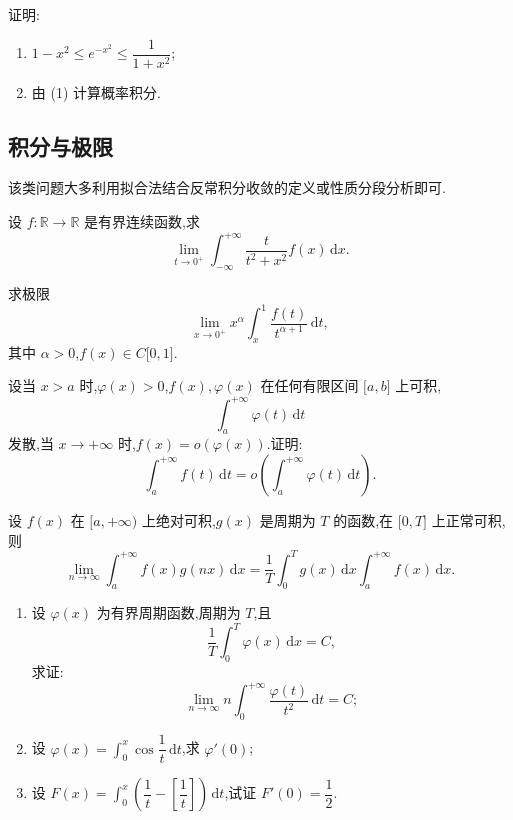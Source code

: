 \documentclass[../数学分析培优讲义.tex]{subfiles}
\begin{document}
\begin{example}
证明:
\begin{enumerate}[label=(\arabic*)]
    \item $1-x^2\leq e^{-x^2}\leq\dfrac{1}{1+x^2}$;
    \item 由 (1) 计算概率积分.
\end{enumerate}
\end{example}
\exampleblank


\newpage

\subsection{积分与极限}

该类问题大多利用拟合法结合反常积分收敛的定义或性质分段分析即可.

\begin{example}
设 $f:\mathbb{R}\to\mathbb{R}$ 是有界连续函数,求
\[
    \lim\limits_{t\to0^+}\int_{-\infty}^{+\infty}\dfrac{t}{t^2+x^2}f(x)\,\mathrm{d}x.
\]
\end{example}
\exampleblank

\begin{example}
求极限
\[
    \lim\limits_{x\to0^+}x^\alpha\int_x^1\dfrac{f(t)}{t^{\alpha+1}}\,\mathrm{d}t,
\]
其中 $\alpha>0$,$f(x)\in C\lbrack 0,1\rbrack$.
\end{example}
\exampleblank

\begin{example}
设当 $x>a$ 时,$\varphi(x)>0$,$f(x),\varphi(x)$ 在任何有限区间 $\lbrack a,b\rbrack$ 上可积,
\[
    \int_a^{+\infty}\varphi(t)\,\mathrm{d}t
\]
发散,当 $x\to+\infty$ 时,$f(x)=o(\varphi(x))$.证明:
\[
    \int_a^{+\infty}f(t)\,\mathrm{d}t
    =o\left(\int_a^{+\infty}\varphi(t)\,\mathrm{d}t\right).
\]
\end{example}
\exampleblank

\begin{proposition}
设 $f(x)$ 在 $\lbrack a,+\infty)$ 上绝对可积,$g(x)$ 是周期为 $T$ 的函数,在 $\lbrack 0,T\rbrack$ 上正常可积,则
\[
    \lim\limits_{n\to\infty}\int_a^{+\infty}f(x)g(nx)\,\mathrm{d}x
    =\dfrac{1}{T}\int_0^Tg(x)\,\mathrm{d}x\int_a^{+\infty}f(x)\,\mathrm{d}x.
\]
\end{proposition}

\begin{example}
\begin{enumerate}[label=(\arabic*)]
    \item 设 $\varphi(x)$ 为有界周期函数,周期为 $T$,且
    \[
        \dfrac{1}{T}\int_0^T\varphi(x)\,\mathrm{d}x=C,
    \]
    求证:
    \[
        \lim\limits_{n\to\infty}n\int_0^{+\infty}\dfrac{\varphi(t)}{t^2}\,\mathrm{d}t=C;
    \]
    \item 设 $\displaystyle\varphi(x)=\int_0^x\cos\dfrac{1}{t}\,\mathrm{d}t$,求 $\varphi'(0)$;
    \item 设 $\displaystyle F(x)=\int_0^x\left(\dfrac{1}{t}-\left[\dfrac{1}{t}\right]\right)\,\mathrm{d}t$,试证 $F'(0)=\dfrac{1}{2}$.
\end{enumerate}
\end{example}
\exampleblank
\end{document}

